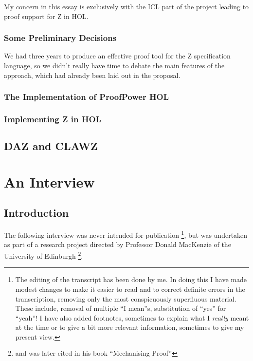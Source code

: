 \documentclass[10pt,titlepage]{book}
\begin{document}
My concern in this essay is exclusively with the ICL part of the project leading to proof support for Z in HOL.

\subsection{Some Preliminary Decisions}
We had three years to produce an effective proof tool for the Z specification language, so we didn't really have time to debate the main features of the approach, which had already been laid out in the proposal.

\subsection{The Implementation of ProofPower HOL}

\subsection{Implementing Z in HOL}

\section{DAZ and CLAWZ}

\appendix

\chapter{An Interview}

\section{Introduction}
The following interview was never intended for publication%
\footnote{
The editing of the transcript has been done by me.
In doing this I have made modest changes to make it easier to read and to correct definite errors in the transcription, removing only the most conspicuously superfluous material.
These include, removal of multiple ``I mean''s, substitution of ``yes'' for ``yeah''!
I have also added footnotes, sometimes to explain what I {\it really} meant at the time or to give a bit more relevant information, sometimes to give my present view.

}, but was undertaken as part of a research project directed by Professor Donald MacKenzie of the University of Edinburgh%
\footnote{
and was later cited in his book ``Mechanising Proof''\cite{mackenzie}}.
\end{document}
